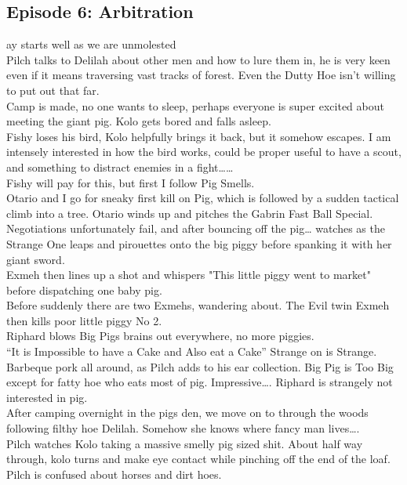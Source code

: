 \subsection{Episode 6: Arbitration}
ay starts well as we are unmolested\\
Pilch talks to Delilah about other men and how to lure them in, he is very keen even if it means traversing vast tracks of forest. Even the Dutty Hoe isn’t willing to put out that far.\\
Camp is made, no one wants to sleep, perhaps everyone is super excited about meeting the giant pig. Kolo gets bored and falls asleep.\\
Fishy loses his bird, Kolo helpfully brings it back, but it somehow escapes. I am intensely interested in how the bird works, could be proper useful to have a scout, and something to distract enemies in a fight……\\
Fishy will pay for this, but first I follow Pig Smells.\\
Otario and I go for sneaky first kill on Pig, which is followed by a sudden tactical climb into a tree. Otario winds up and pitches the Gabrin Fast Ball Special. Negotiations unfortunately fail, and after bouncing off the pig… watches as the Strange One leaps and pirouettes onto the big piggy before spanking it with her giant sword.\\
Exmeh then lines up a shot and whispers "This little piggy went to market" before dispatching one baby pig.\\
Before suddenly there are two Exmehs, wandering about. The Evil twin Exmeh then kills poor little piggy No 2.\\
Riphard blows Big Pigs brains out everywhere, no more piggies.\\
“It is Impossible to have a Cake and Also eat a Cake” Strange on is Strange.\\
Barbeque pork all around, as Pilch adds to his ear collection. Big Pig is Too Big except for fatty hoe who eats most of pig. Impressive…. Riphard is strangely not interested in pig.\\
After camping overnight in the pigs den, we move on to through the woods following filthy hoe Delilah. Somehow she knows where fancy man lives….\\
Pilch watches Kolo taking a massive smelly pig sized shit. About half way through, kolo turns and make eye contact while pinching off the end of the loaf.\\
Pilch is confused about horses and dirt hoes.\\
